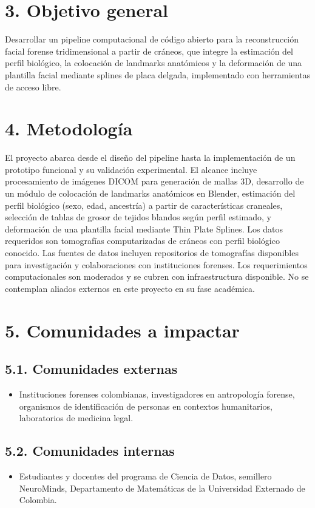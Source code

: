 \documentclass[a4paper,12pt]{article}
\begin{document}
\section*{3. Objetivo general}
Desarrollar un pipeline computacional de código abierto para la reconstrucción facial forense tridimensional a partir de cráneos, que integre la estimación del perfil biológico, la colocación de landmarks anatómicos y la deformación de una plantilla facial mediante splines de placa delgada, implementado con herramientas de acceso libre.

\section*{4. Metodología}
El proyecto abarca desde el diseño del pipeline hasta la implementación de un prototipo funcional y su validación experimental. El alcance incluye procesamiento de imágenes DICOM para generación de mallas 3D, desarrollo de un módulo de colocación de landmarks anatómicos en Blender, estimación del perfil biológico (sexo, edad, ancestría) a partir de características craneales, selección de tablas de grosor de tejidos blandos según perfil estimado, y deformación de una plantilla facial mediante Thin Plate Splines. Los datos requeridos son tomografías computarizadas de cráneos con perfil biológico conocido. Las fuentes de datos incluyen repositorios de tomografías disponibles para investigación y colaboraciones con instituciones forenses. Los requerimientos computacionales son moderados y se cubren con infraestructura disponible. No se contemplan aliados externos en este proyecto en su fase académica.

\section*{5. Comunidades a impactar}
\subsection*{5.1. Comunidades externas}
\begin{itemize}
    \item Instituciones forenses colombianas, investigadores en antropología forense, organismos de identificación de personas en contextos humanitarios, laboratorios de medicina legal.
\end{itemize}

\subsection*{5.2. Comunidades internas}
\begin{itemize}
    \item Estudiantes y docentes del programa de Ciencia de Datos, semillero NeuroMinds, Departamento de Matemáticas de la Universidad Externado de Colombia.
\end{itemize}
\end{document}
